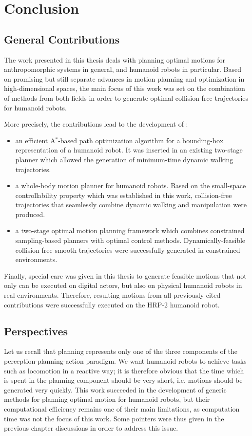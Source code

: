 \chapter{Conclusion}
\label{chap:conclusion}

\section{General Contributions}

The work presented in this thesis deals with planning optimal motions
for anthropomorphic systems in general, and humanoid robots in
particular. Based on promising but still separate advances in motion
planning and optimization in high-dimensional spaces, the main focus
of this work was set on the combination of methods from both fields in
order to generate optimal collision-free trajectories for humanoid
robots.

More precisely, the contributions lead to the development of :
\begin{itemize}
\item an efficient A$^*$-based path optimization algorithm for a
  bounding-box representation of a humanoid robot. It was inserted in
  an existing two-stage planner which allowed the generation of
  minimum-time dynamic walking trajectories.
\item a whole-body motion planner for humanoid robots. Based on the
  small-space controllability property which was established in this
  work, collision-free trajectories that seamlessly combine dynamic
  walking and manipulation were produced.
\item a two-stage optimal motion planning framework which combines
  constrained sampling-based planners with optimal control
  methods. Dynamically-feasible collision-free smooth trajectories
  were successfully generated in constrained environments.
\end{itemize}

Finally, special care was given in this thesis to generate feasible
motions that not only can be executed on digital actors, but also on
physical humanoid robots in real environments. Therefore, resulting
motions from all previously cited contributions were successfully
executed on the HRP-2 humanoid robot.

\section{Perspectives}

Let us recall that planning represents only one of the three
components of the perception-planning-action paradigm. We want
humanoid robots to achieve tasks such as locomotion in a reactive way;
it is therefore obvious that the time which is spent in the planning
component should be very short, i.e. motions should be generated very
quickly. This work succeeded in the development of generic methods for
planning optimal motion for humanoid robots, but their computational
efficiency remains one of their main limitations, as computation time
was not the focus of this work. Some pointers were thus given in the
previous chapter discussions in order to address this issue.

